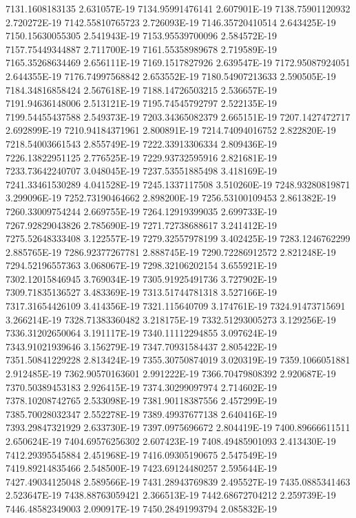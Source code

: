 7131.1608183135  2.631057E-19
7134.95991476141  2.607901E-19
7138.75901120932  2.720272E-19
7142.55810765723  2.726093E-19
7146.35720410514  2.643425E-19
7150.15630055305  2.541943E-19
7153.95539700096  2.584572E-19
7157.75449344887  2.711700E-19
7161.55358989678  2.719589E-19
7165.35268634469  2.656111E-19
7169.1517827926  2.639547E-19
7172.95087924051  2.644355E-19
7176.74997568842  2.653552E-19
7180.54907213633  2.590505E-19
7184.34816858424  2.567618E-19
7188.14726503215  2.536657E-19
7191.94636148006  2.513121E-19
7195.74545792797  2.522135E-19
7199.54455437588  2.549373E-19
7203.34365082379  2.665151E-19
7207.1427472717  2.692899E-19
7210.94184371961  2.800891E-19
7214.74094016752  2.822820E-19
7218.54003661543  2.855749E-19
7222.33913306334  2.809436E-19
7226.13822951125  2.776525E-19
7229.93732595916  2.821681E-19
7233.73642240707  3.048045E-19
7237.53551885498  3.418169E-19
7241.33461530289  4.041528E-19
7245.1337117508  3.510260E-19
7248.93280819871  3.299096E-19
7252.73190464662  2.898200E-19
7256.53100109453  2.861382E-19
7260.33009754244  2.669755E-19
7264.12919399035  2.699733E-19
7267.92829043826  2.785690E-19
7271.72738688617  3.241412E-19
7275.52648333408  3.122557E-19
7279.32557978199  3.402425E-19
7283.1246762299  2.885765E-19
7286.92377267781  2.888745E-19
7290.72286912572  2.821248E-19
7294.52196557363  3.068067E-19
7298.32106202154  3.655921E-19
7302.12015846945  3.769034E-19
7305.91925491736  3.727902E-19
7309.71835136527  3.483369E-19
7313.51744781318  3.527166E-19
7317.31654426109  3.414356E-19
7321.115640709  3.174761E-19
7324.91473715691  3.266214E-19
7328.71383360482  3.218175E-19
7332.51293005273  3.129256E-19
7336.31202650064  3.191117E-19
7340.11112294855  3.097624E-19
7343.91021939646  3.156279E-19
7347.70931584437  2.805422E-19
7351.50841229228  2.813424E-19
7355.30750874019  3.020319E-19
7359.1066051881  2.912485E-19
7362.90570163601  2.991222E-19
7366.70479808392  2.920687E-19
7370.50389453183  2.926415E-19
7374.30299097974  2.714602E-19
7378.10208742765  2.533098E-19
7381.90118387556  2.457299E-19
7385.70028032347  2.552278E-19
7389.49937677138  2.640416E-19
7393.29847321929  2.633730E-19
7397.0975696672  2.804419E-19
7400.89666611511  2.650624E-19
7404.69576256302  2.607423E-19
7408.49485901093  2.413430E-19
7412.29395545884  2.451968E-19
7416.09305190675  2.547549E-19
7419.89214835466  2.548500E-19
7423.69124480257  2.595644E-19
7427.49034125048  2.589566E-19
7431.28943769839  2.495527E-19
7435.0885341463  2.523647E-19
7438.88763059421  2.366513E-19
7442.68672704212  2.259739E-19
7446.48582349003  2.090917E-19
7450.28491993794  2.085832E-19
